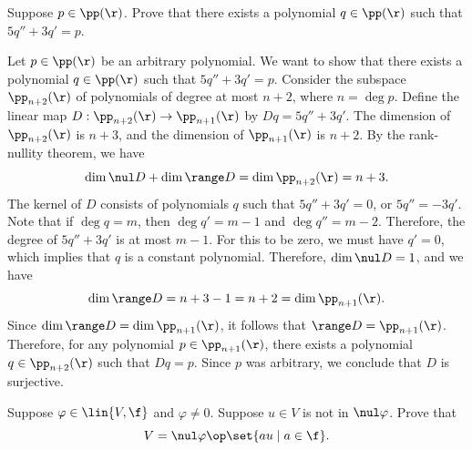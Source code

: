 \begin{exercise}[3b29]
    Suppose $p \in \pp(\r)$. Prove that there exists a polynomial $q \in \pp(\r)$ such that $5q'' + 3q' = p$.
\end{exercise}

\begin{sol}
    Let $p \in \pp(\r)$ be an arbitrary polynomial. We want to show that there exists a polynomial $q \in \pp(\r)$ such that $5q'' + 3q' = p$. Consider the subspace $\pp_{n + 2}(\r)$ of polynomials of degree at most $n + 2$, where $n = \deg p$. Define the linear map $D: \pp_{n + 2}(\r) \to \pp_{n + 1}(\r)$ by $Dq = 5q'' + 3q'$. The dimension of $\pp_{n + 2}(\r)$ is $n + 3$, and the dimension of $\pp_{n + 1}(\r)$ is $n + 2$. By the rank-nullity theorem, we have
    \[\dim \nul D + \dim \range D = \dim \pp_{n + 2}(\r) = n + 3.\]
    The kernel of $D$ consists of polynomials $q$ such that $5q'' + 3q' = 0$, or $5q'' = -3q'$. Note that if $\deg q = m$, then $\deg q' = m - 1$ and $\deg q'' = m - 2$. Therefore, the degree of $5q'' + 3q'$ is at most $m - 1$. For this to be zero, we must have $q' = 0$, which implies that $q$ is a constant polynomial. Therefore, $\dim \nul D = 1$, and we have
    \[\dim \range D = n + 3 - 1 = n + 2 = \dim \pp_{n + 1}(\r).\]
    Since $\dim \range D = \dim \pp_{n + 1}(\r)$, it follows that $\range D = \pp_{n + 1}(\r)$. Therefore, for any polynomial $p \in \pp_{n + 1}(\r)$, there exists a polynomial $q \in \pp_{n + 2}(\r)$ such that $Dq = p$. Since $p$ was arbitrary, we conclude that $D$ is surjective.
\end{sol}

\begin{exercise}[3b30]
    Suppose $\varphi \in \lin{V, \f}$ and $\varphi \neq 0$. Suppose $u \in V$ is not in $\nul \varphi$. Prove that
    \[V = \nul \varphi \op \set{au \mid a \in \f}.\]
\end{exercise}

